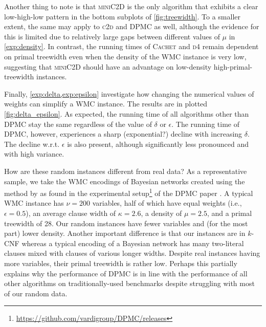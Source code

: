 Another thing to note is that \textsc{miniC2D} \citep{DBLP:conf/ijcai/OztokD15}
is the only algorithm that exhibits a clear low-high-low pattern in the bottom
subplots of \cref{fig:treewidth}. To a smaller extent, the same may apply to
\textsc{c2d} and \textsc{DPMC} as well, although the evidence for this is
limited due to relatively large gaps between different values of $\mu$ in
\cref{exp:density}. In contrast, the running times of \textsc{Cachet} and
\textsc{d4} remain dependent on primal treewidth even when the density of the
WMC instance is very low, suggesting that \textsc{miniC2D} should have an
advantage on low-density high-primal-treewidth instances.

Finally, \cref{exp:delta,exp:epsilon} investigate how changing the numerical
values of weights can simplify a WMC instance. The results are in plotted
\cref{fig:delta_epsilon}. As expected, the running time of all algorithms other
than \textsc{DPMC} stay the same regardless of the value of $\delta$ or
$\epsilon$. The running time of \textsc{DPMC}, however, experiences a sharp
(exponential?) decline with increasing $\delta$. The decline w.r.t. $\epsilon$
is also present, although significantly less pronounced and with high variance.

How are these random instances different from real data? As a representative
sample, we take the WMC encodings of Bayesian networks created using the method
by \citet{DBLP:conf/aaai/SangBK05} as found in the experimental
setup\footnote{\url{https://github.com/vardigroup/DPMC/releases}} of the
\textsc{DPMC} paper \citep{DBLP:conf/cp/DudekPV20}. A typical WMC instance has
$\nu = 200$ variables, half of which have equal weights (i.e.,
$\epsilon = 0.5$), an average clause width of $\kappa = 2.6$, a density of
$\mu = 2.5$, and a primal treewidth of 28. Our random instances have fewer
variables and (for the most part) lower density. Another important difference is
that our instances are in $k$-CNF whereas a typical encoding of a Bayesian
network has many two-literal clauses mixed with clauses of various longer
widths. Despite real instances having more variables, their primal treewidth is
rather low. Perhaps this partially explains why the performance of \textsc{DPMC}
is in line with the performance of all other algorithms on traditionally-used
benchmarks \citep{DBLP:conf/cp/DudekPV20} despite struggling with most of our
random data.


